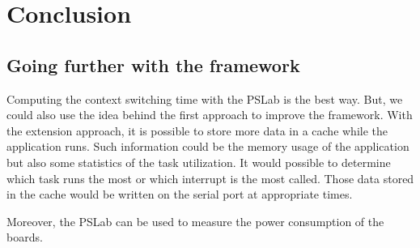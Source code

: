 \chapter*{Conclusion}

\section{Going further with the framework}

Computing the context switching time with the PSLab is the best way.
But, we could also use the idea behind the first approach to improve the framework.
With the extension approach, it is possible to store more data in a cache while the application runs.
Such information could be the memory usage of the application but also some statistics of the task utilization.
It would possible to determine which task runs the most or which interrupt is the most called.
Those data stored in the cache would be written on the serial port at appropriate times.

Moreover, the PSLab can be used to measure the power consumption of the boards.
